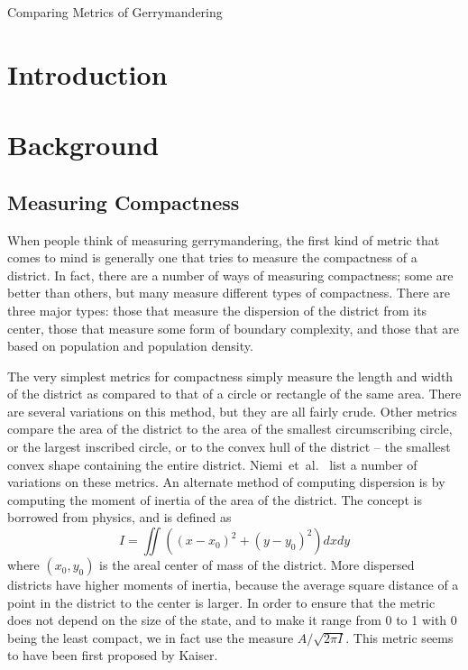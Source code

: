 \documentclass[12pt]{article}
\begin{document}
  \begin{center}
    \LARGE Comparing Metrics of Gerrymandering
    \vspace{-0.5em}
  \end{center}
  \nocite{*}
  \doublespacing{}

  \section{Introduction}
  
  \section{Background}\label{background}
  
  \subsection{Measuring Compactness}

  When people think of measuring gerrymandering, the first kind of metric that comes to mind is generally one that tries to measure the compactness of a district.  In fact, there are a number of ways of measuring compactness; some are better than others, but many measure different types of compactness.  There are three major types: those that measure the dispersion of the district from its center, those that measure some form of boundary complexity, and those that are based on population and population density.

  The very simplest metrics for compactness simply measure the length and width of the district as compared to that of a circle or rectangle of the same area.  There are several variations on this method, but they are all fairly crude.  Other metrics compare the area of the district to the area of the smallest circumscribing circle, or the largest inscribed circle, or to the convex hull of the district -- the smallest convex shape containing the entire district.  Niemi~et~al.~\cite{niemi} list a number of variations on these metrics.  An alternate method of computing dispersion is by computing the moment of inertia of the area of the district.  The concept is borrowed from physics, and is defined as
  \[I = \iint ((x-x_0)^2 + (y-y_0)^2) dx dy \]
  where $(x_0, y_0)$ is the areal center of mass of the district.  More dispersed districts have higher moments of inertia, because the average square distance of a point in the district to the center is larger.  In order to ensure that the metric does not depend on the size of the state, and to make it range from 0 to 1 with 0 being the least compact, we in fact use the measure $A/\sqrt{2\pi I}$.  This metric seems to have been first proposed by Kaiser.~\cite{kaiser}
\end{document}
